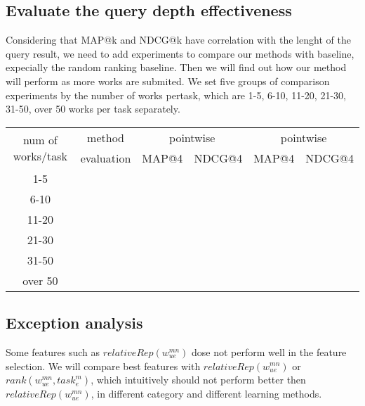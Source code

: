 \subsection{Evaluate the query depth effectiveness}
Considering that MAP@k and NDCG@k have correlation with the lenght of the query result, we need to add experiments to compare our methods with baseline, expecially the random ranking baseline. Then we will find out how our method will perform as more works are submited.
We set five groups of comparison experiments by the number of works pertask, which are 1-5, 6-10, 11-20, 21-30, 31-50, over 50 works per task separately.\\
\begin{tabular}{|c|c|c|c|c|c|}

\hline
\multirow{2}{*}{num of works/task}  & method  & \multicolumn{2}{c|}{pointwise}  & \multicolumn{2}{c|}{pointwise} \\
\cline{2-6}
 &evaluation&MAP@4&NDCG@4&MAP@4&NDCG@4 \\
\hline
1-5 & & & & &\\
\hline
6-10 & & & & &\\
\hline  
11-20 & & & & &\\
\hline
21-30 & & & & &\\
\hline
31-50 & & & & &\\
\hline
over 50 & & & & &\\
\hline
\end{tabular}
\subsection{Exception analysis}
Some features such as $relativeRep({w}_{ue}^{mn})$ dose not perform well in the feature selection. We will compare  best features with $relativeRep({w}_{ue}^{mn})$ or $rank({w}_{ue}^{mn}, {task}_{e}^{m})$, which intuitively should not perform better then $relativeRep({w}_{ue}^{mn})$, in different category and different learning methods. 
